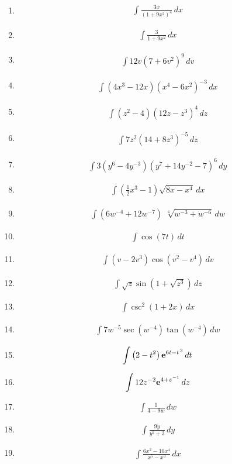\documentclass[twoside, fleqn,12pt,letterpaper]{book}
\newcommand{\makeitem}[2]{\item {#2}\begin{align*} {#1}
  \end{align*}}
\newcommand{\makeitemlamar}[1]{\makeitem{{#1}}{\cite{lamar}}}
\begin{document}
\begin{multicols}{2}
\begin{enumerate}
  \makeitemlamar{\displaystyle \int   {{\frac{{3x}}{{{{\left( {1 + 9{x^2}} \right)}^4}}}\,dx}}}
  
  \makeitemlamar{\displaystyle \int   {{\frac{3}{{1 + 9{x^2}}}\,dx}}}
  
  \makeitemlamar{\displaystyle \int   {{12v{{\left( {7 + 6{v^2}} \right)}^9}\,dv}}}
  
  \makeitemlamar{\displaystyle \int   {{\left( {4{x^3} - 12x} \right){{\left( {{x^4} - 6{x^2}} \right)}^{ - 3}}\,dx}}}
  
  \makeitemlamar{\displaystyle \int   {{\left( {{z^2} - 4} \right){{\left( {12z - {z^3}} \right)}^4}\,dz}}}
  
  \makeitemlamar{\displaystyle \int   {{7{z^2}{{\left( {14 + 8{z^3}} \right)}^{ - 5}}\,dz}}}
  
  \makeitemlamar{\displaystyle \int   {{3\left( {{y^6} - 4{y^{ - 3}}} \right){{\left( {{y^7} + 14{y^{ - 2}} - 7} \right)}^6}\,dy}}}
  
  \makeitemlamar{\displaystyle \int   {{\left( {\frac{1}{2}{x^3} - 1} \right)\sqrt {8x - {x^4}} \,dx}}}
  
  \makeitemlamar{\displaystyle \int   {{\left( {6{w^{ - 4}} + 12{w^{ - 7}}} \right)\,\,\sqrt[4]{{{w^{ - 3}} + {w^{ - 6}}}}\,dw}}}
  
  \makeitemlamar{\displaystyle \int   {{\cos \left( {7t} \right)\,dt}}}
  
  \makeitemlamar{\displaystyle \int   {{\left( {v - 2{v^3}} \right)\cos \left( {{v^2} - {v^4}} \right)\,dv}}}
  
  \makeitemlamar{\displaystyle \int   {{\sqrt z \sin \left( {1 + \sqrt {{z^3}} } \right)\,dz}}}
  
  \makeitemlamar{\displaystyle \int   {{{{\csc }^2}\left( {1 + 2x} \right)\,dx}}}
  
  
  \makeitemlamar{\displaystyle \int   {{7{w^{ - 5}}\sec \left( {{w^{ - 4}}} \right)\tan \left( {{w^{ - 4}}} \right)\,dw}}}
  
  \makeitemlamar{\displaystyle \int   {{\left( {2 - {t^2}} \right){{\bf{e}}^{6t - {t^{\,3}}}}\,dt}}}
  
  \makeitemlamar{\displaystyle \int   {{12{z^{ - 2}}{{\bf{e}}^{4 + {z^{ - 1}}}}\,dz}}}
  
  \makeitemlamar{\displaystyle \int   {{\frac{1}{{4 - 9w}}\,dw}}}
  
  \makeitemlamar{\displaystyle \int   {{\frac{{9y}}{{{y^2} + 3}}\,dy}}}
  
  \makeitemlamar{\displaystyle \int   {{\frac{{6{x^2} - 10{x^4}}}{{{x^5} - {x^3}}}\,dx}}}
  

\end{enumerate}
\end{multicols}
\end{document}
